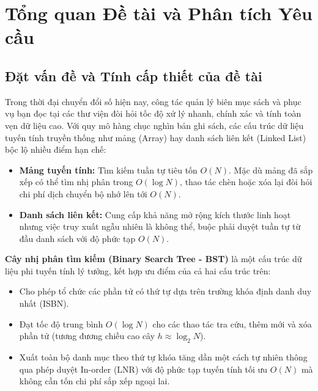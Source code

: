 \chapter{Tổng quan Đề tài và Phân tích Yêu cầu}
\label{chap:chuong1}

\section{Đặt vấn đề và Tính cấp thiết của đề tài}
Trong thời đại chuyển đổi số hiện nay, công tác quản lý biên mục sách và phục vụ bạn đọc tại các thư viện đòi hỏi tốc độ xử lý nhanh, chính xác và tính toàn vẹn dữ liệu cao. Với quy mô hàng chục nghìn bản ghi sách, các cấu trúc dữ liệu tuyến tính truyền thống như mảng (Array) hay danh sách liên kết (Linked List) bộc lộ nhiều điểm hạn chế:
\begin{itemize}
    \item \textbf{Mảng tuyến tính:} Tìm kiếm tuần tự tiêu tốn $O(N)$. Mặc dù mảng đã sắp xếp có thể tìm nhị phân trong $O(\log N)$, thao tác chèn hoặc xóa lại đòi hỏi chi phí dịch chuyển bộ nhớ lên tới $O(N)$.
    \item \textbf{Danh sách liên kết:} Cung cấp khả năng mở rộng kích thước linh hoạt nhưng việc truy xuất ngẫu nhiên là không thể, buộc phải duyệt tuần tự từ đầu danh sách với độ phức tạp $O(N)$.
\end{itemize}

\textbf{Cây nhị phân tìm kiếm (Binary Search Tree - BST)} là một cấu trúc dữ liệu phi tuyến tính lý tưởng, kết hợp ưu điểm của cả hai cấu trúc trên:
\begin{itemize}
    \item Cho phép tổ chức các phần tử có thứ tự dựa trên trường khóa định danh duy nhất (ISBN).
    \item Đạt tốc độ trung bình $O(\log N)$ cho các thao tác tra cứu, thêm mới và xóa phần tử (tương đương chiều cao cây $h \approx \log_2 N$).
    \item Xuất toàn bộ danh mục theo thứ tự khóa tăng dần một cách tự nhiên thông qua phép duyệt In-order (LNR) với độ phức tạp tuyến tính tối ưu $O(N)$ mà không cần tốn chi phí sắp xếp ngoại lai.
\end{itemize}

